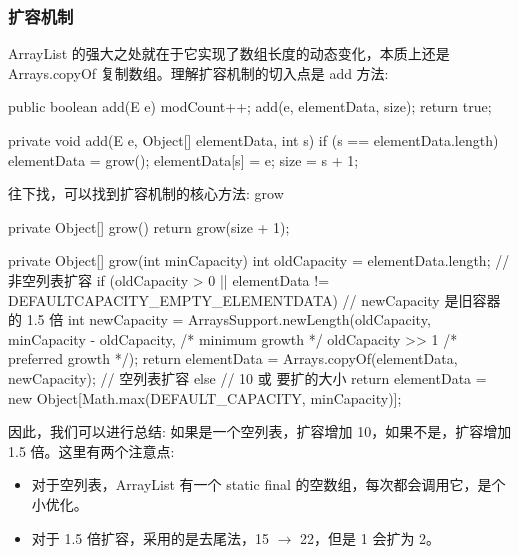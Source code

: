\subsubsection{扩容机制}


ArrayList 的强大之处就在于它实现了数组长度的动态变化，本质上还是 Arrays.copyOf 复制数组。理解扩容机制的切入点是 add 方法:

\begin{Java}
public boolean add(E e) {
    modCount++;
    add(e, elementData, size);
    return true;
}

private void add(E e, Object[] elementData, int s) {
    if (s == elementData.length)
        elementData = grow();
    elementData[s] = e;
    size = s + 1;
}
\end{Java}

往下找，可以找到扩容机制的核心方法: grow

\begin{Java}
private Object[] grow() {
    return grow(size + 1);
}

private Object[] grow(int minCapacity) {
    int oldCapacity = elementData.length;
    // 非空列表扩容
    if (oldCapacity > 0 || elementData != DEFAULTCAPACITY_EMPTY_ELEMENTDATA) {
        // newCapacity 是旧容器的 1.5 倍
        int newCapacity = ArraysSupport.newLength(oldCapacity,
                minCapacity - oldCapacity, /* minimum growth */
                oldCapacity >> 1           /* preferred growth */);
        return elementData = Arrays.copyOf(elementData, newCapacity);
    // 空列表扩容
    } else {
        // 10 或 要扩的大小
        return elementData = new Object[Math.max(DEFAULT_CAPACITY, minCapacity)];
    }
}
\end{Java}

因此，我们可以进行总结: 如果是一个空列表，扩容增加 10，如果不是，扩容增加 1.5 倍。这里有两个注意点:

\begin{itemize}
    \item 对于空列表，ArrayList 有一个 static final 的空数组，每次都会调用它，是个小优化。
    \item 对于 1.5 倍扩容，采用的是去尾法，15 $\rightarrow$ 22，但是 1 会扩为 2。
\end{itemize}

